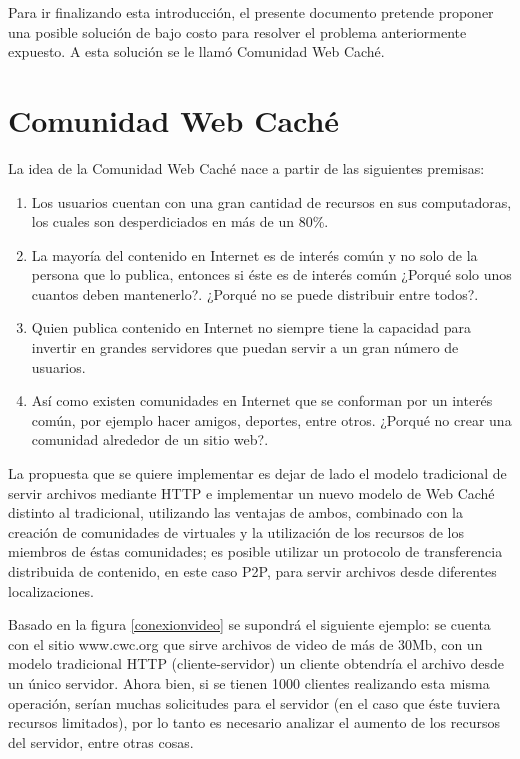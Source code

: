 Para ir finalizando esta introducción, el presente documento pretende proponer una posible solución de bajo costo para resolver el problema anteriormente expuesto. A esta solución se le llamó Comunidad Web Caché. 


\section{Comunidad Web Caché}

La idea de la Comunidad Web Caché nace a partir de las siguientes premisas:

\begin{enumerate}
\item Los usuarios cuentan con una gran cantidad de recursos en sus computadoras, los cuales son desperdiciados en más de un 80\%.
\item La mayoría del contenido en Internet es de interés común y no solo de la persona que lo publica, entonces si éste es de interés común ¿Porqué solo unos cuantos deben mantenerlo?. ¿Porqué no se puede distribuir entre todos?.
\item Quien publica contenido en Internet no siempre tiene la capacidad para invertir en grandes servidores que puedan servir a un gran número de usuarios.
\item Así como existen comunidades en Internet que se conforman por un interés común, por ejemplo hacer amigos, deportes, entre otros. ¿Porqué no crear una comunidad alrededor de un sitio web?.
\end{enumerate}

La propuesta que se quiere implementar es dejar de lado el modelo tradicional de servir archivos mediante HTTP e implementar un nuevo modelo de Web Caché distinto al tradicional, utilizando las ventajas de ambos, combinado con la creación de comunidades de virtuales y la utilización de los recursos de los miembros de éstas comunidades; es posible utilizar un protocolo de transferencia distribuida de contenido, en este caso P2P, para servir archivos desde diferentes localizaciones.

Basado en la figura \ref{conexionvideo} se supondrá el siguiente ejemplo: se cuenta con el sitio www.cwc.org que sirve archivos de video de más de 30Mb, con un modelo tradicional HTTP (cliente-servidor) un cliente obtendría el archivo desde un único servidor. Ahora bien, si se tienen 1000 clientes realizando esta misma operación, serían muchas solicitudes para el servidor (en el caso que éste tuviera recursos limitados), por lo tanto es necesario analizar el aumento de los recursos del servidor, entre otras cosas. 

